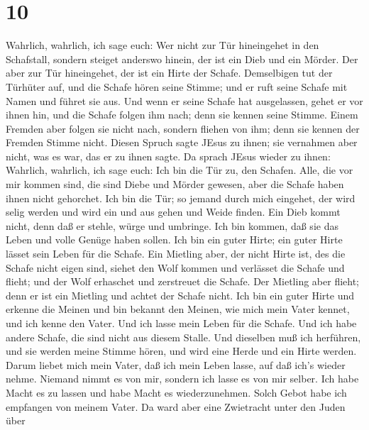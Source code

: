 \hypertarget{section-9}{%
\section{10}\label{section-9}}

 Wahrlich, wahrlich, ich sage euch: Wer nicht zur Tür
hineingehet in den Schafstall, sondern steiget anderswo hinein, der ist
ein Dieb und ein Mörder.  Der aber zur Tür hineingehet, der
ist ein Hirte der Schafe.  Demselbigen tut der Türhüter auf,
und die Schafe hören seine Stimme; und er ruft seine Schafe mit Namen
und führet sie aus.  Und wenn er seine Schafe hat
ausgelassen, gehet er vor ihnen hin, und die Schafe folgen ihm nach;
denn sie kennen seine Stimme.  Einem Fremden aber folgen sie
nicht nach, sondern fliehen von ihm; denn sie kennen der Fremden Stimme
nicht.  Diesen Spruch sagte JEsus zu ihnen; sie vernahmen
aber nicht, was es war, das er zu ihnen sagte.  Da sprach
JEsus wieder zu ihnen: Wahrlich, wahrlich, ich sage euch: Ich bin die
Tür zu, den Schafen.  Alle, die vor mir kommen sind, die
sind Diebe und Mörder gewesen, aber die Schafe haben ihnen nicht
gehorchet.  Ich bin die Tür; so jemand durch mich eingehet,
der wird selig werden und wird ein und aus gehen und Weide finden.
 Ein Dieb kommt nicht, denn daß er stehle, würge und
umbringe.  Ich bin kommen, daß sie das Leben und volle
Genüge haben sollen.  Ich bin ein guter Hirte; ein guter
Hirte lässet sein Leben für die Schafe. Ein Mietling aber, der nicht
Hirte ist, des die Schafe nicht eigen sind, siehet den Wolf kommen und
verlässet die Schafe und flieht; und der Wolf erhaschet und zerstreuet
die Schafe.  Der Mietling aber flieht; denn er ist ein
Mietling und achtet der Schafe nicht.  Ich bin ein guter
Hirte und erkenne die Meinen und bin bekannt den Meinen, 
wie mich mein Vater kennet, und ich kenne den Vater. Und ich lasse mein
Leben für die Schafe.  Und ich habe andere Schafe, die sind
nicht aus diesem Stalle. Und dieselben muß ich herführen, und sie werden
meine Stimme hören, und wird eine Herde und ein Hirte werden.
 Darum liebet mich mein Vater, daß ich mein Leben lasse,
auf daß ich's wieder nehme.  Niemand nimmt es von mir,
sondern ich lasse es von mir selber. Ich habe Macht es zu lassen und
habe Macht es wiederzunehmen. Solch Gebot habe ich empfangen von meinem
Vater.  Da ward aber eine Zwietracht unter den Juden über
